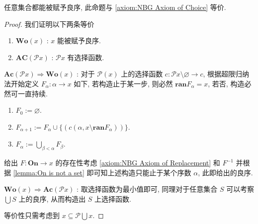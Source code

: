 \begin{theorem}
     \label{theorem:well-ordering theorem}
    任意集合都能被赋予良序, 此命题与 \ref{axiom:NBG Axiom of Choice} 等价.

    \begin{proof}
        我们证明以下两条等价
        \begin{enumerate}
            \item \(\mathbf{Wo} (x)\) : \(x\) 能被赋予良序.
            \item \(\mathbf{AC} (\mathcal{P} x)\) : \(\mathcal{P} x\) 有选择函数.
        \end{enumerate}

        \(\mathbf{Ac} (\mathcal{P}x) \Rightarrow \mathbf{Wo} (x)\) : 对于 \(\mathcal{P} (x)\) 上的选择函数 \(c : \mathcal{P}x \setminus {\varnothing} \to c\),
        根据超限归纳法开始定义 \(F_\alpha : \alpha \to x\) 如下, 若构造止于某一步, 则必然 \(\mathbf{ran} F_\alpha = x\), 若否, 构造必然可一直持续.

        \begin{enumerate}
            \item \(F_0 := \varnothing\).
            \item \(F_{\alpha + 1} := F_\alpha \cup \{(c (\alpha,x \setminus \mathbf{ran} F_\alpha))\}\).
            \item \(F_\alpha := \bigcup_{\beta < \alpha} F_\beta\).
        \end{enumerate}

        给出 \(F : \mathbf{On} \to x\) 的存在性考虑 \ref{axiom:NBG Axiom of Replacement} 和 \(F^{-1}\) 并根据 \ref{lemma:On is not a set} 即可知上述构造只能止于某个序数 \(\alpha\), 此即给出的良序.

        \(\mathbf{Wo} (x) \Rightarrow \mathbf{Ac} (\mathcal{P}x)\) : 取选择函数为最小值即可, 同理对于任意集合 \(S\) 可以考察 \(\bigcup S\) 上的良序, 从而构造出 \(S\) 上选择函数.

        等价性只需考虑到 \(x \subseteq \mathcal{P} \bigcup x\).
    \end{proof}
\end{theorem}

